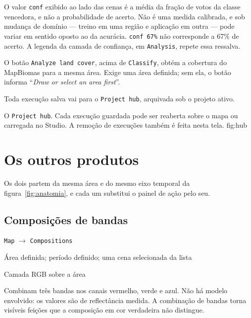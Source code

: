 \documentclass[12pt,a4paper]{article}
\newcommand{\msg}[1]{``\textit{#1}''}
\begin{document}
\begin{objecao}
O valor \texttt{conf} exibido ao lado das cenas \'e a m\'edia da fra\c{c}\~ao
de votos da classe vencedora, e n\~ao a probabilidade de acerto. N\~ao \'e uma
medida calibrada, e sob mudan\c{c}a de dom\'inio --- treino em uma regi\~ao e
aplica\c{c}\~ao em outra --- pode variar em sentido oposto ao da acur\'acia.
\texttt{conf 67\%} n\~ao corresponde a 67\% de acerto. A legenda da camada de
confian\c{c}a, em \texttt{Analysis}, repete essa ressalva.
\end{objecao}

 O bot\~ao \texttt{Analyze land cover},
acima de \texttt{Classify}, obt\'em a cobertura do MapBiomas para a mesma
\'area. Exige uma \'area definida; sem ela, o bot\~ao informa \msg{Draw or
select an area first}.

 Toda execu\c{c}\~ao salva vai para o
\texttt{Project hub}, arquivada sob o projeto ativo.

  {O \texttt{Project hub}. Cada execu\c{c}\~ao guardada pode ser reaberta sobre
   o mapa ou carregada no Studio. A remo\c{c}\~ao de execu\c{c}\~oes tamb\'em
   \'e feita nesta tela.}
  {fig:hub}

\section{Os outros produtos}

Os dois partem da mesma \'area e do mesmo eixo temporal da
figura~\ref{fig:anatomia}, e cada um substitui o painel de a\c{c}\~ao pelo seu.

\subsection{Composi\c{c}\~oes de bandas}

\begin{ficha}
  \item[Painel] \texttt{Map} $\rightarrow$ \texttt{Compositions}
  \item[Pr\'e-condi\c{c}\~oes] \'Area definida; per\'iodo definido; uma cena
        selecionada da lista
  \item[Sa\'ida] Camada RGB sobre a \'area
\end{ficha}

Combinam tr\^es bandas nos canais vermelho, verde e azul. N\~ao h\'a modelo
envolvido: os valores s\~ao de reflect\^ancia medida. A combina\c{c}\~ao de
bandas torna vis\'iveis fei\c{c}\~oes que a composi\c{c}\~ao em cor verdadeira
n\~ao distingue.
\end{document}
